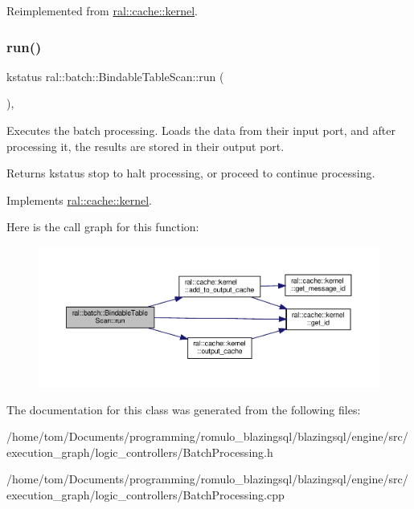 Reimplemented from \hyperlink{classral_1_1cache_1_1kernel_abf40aaa022e3bf38c261977d0c2170cb}{ral\+::cache\+::kernel}.

\mbox{\label{classral_1_1batch_1_1BindableTableScan_a3215b390c1b588e165724b108038cbf9}} 
\subsubsection{\texorpdfstring{run()}{run()}}
{\footnotesize\ttfamily kstatus ral\+::batch\+::\+Bindable\+Table\+Scan\+::run (\begin{DoxyParamCaption}{ }\end{DoxyParamCaption})\hspace{0.3cm}{\ttfamily [override]}, {\ttfamily [virtual]}}

Executes the batch processing. Loads the data from their input port, and after processing it, the results are stored in their output port. \begin{DoxyReturn}{Returns}
kstatus \textquotesingle{}stop\textquotesingle{} to halt processing, or \textquotesingle{}proceed\textquotesingle{} to continue processing. 
\end{DoxyReturn}


Implements \hyperlink{classral_1_1cache_1_1kernel_a735b081cccae9574924e74ea6d293ef7}{ral\+::cache\+::kernel}.

Here is the call graph for this function\+:\nopagebreak
\begin{figure}[H]
\begin{center}
\leavevmode
\includegraphics[width=350pt]{classral_1_1batch_1_1BindableTableScan_a3215b390c1b588e165724b108038cbf9_cgraph}
\end{center}
\end{figure}


The documentation for this class was generated from the following files\+:\begin{DoxyCompactItemize}
\item 
/home/tom/\+Documents/programming/romulo\+\_\+blazingsql/blazingsql/engine/src/execution\+\_\+graph/logic\+\_\+controllers/Batch\+Processing.\+h\item 
/home/tom/\+Documents/programming/romulo\+\_\+blazingsql/blazingsql/engine/src/execution\+\_\+graph/logic\+\_\+controllers/Batch\+Processing.\+cpp\end{DoxyCompactItemize}
